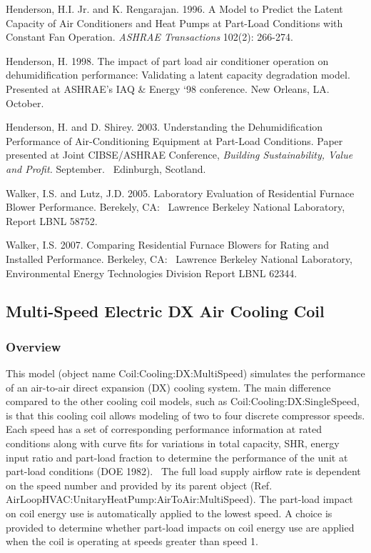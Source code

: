 Henderson, H.I. Jr. and K. Rengarajan. 1996. A Model to Predict the Latent Capacity of Air Conditioners and Heat Pumps at Part-Load Conditions with Constant Fan Operation. \emph{ASHRAE Transactions} 102(2): 266-274.

Henderson, H. 1998. The impact of part load air conditioner operation on dehumidification performance: Validating a latent capacity degradation model. Presented at ASHRAE's IAQ \& Energy `98 conference. New Orleans, LA.~ October.

Henderson, H. and D. Shirey. 2003. Understanding the Dehumidification Performance of Air-Conditioning Equipment at Part-Load Conditions. Paper presented at Joint CIBSE/ASHRAE Conference, \emph{Building Sustainability, Value and Profit.} September.~ Edinburgh, Scotland.

Walker, I.S. and Lutz, J.D. 2005. Laboratory Evaluation of Residential Furnace Blower Performance. Berekely, CA:~ Lawrence Berkeley National Laboratory, Report LBNL 58752.

Walker, I.S. 2007. Comparing Residential Furnace Blowers for Rating and Installed Performance. Berkeley, CA:~ Lawrence Berkeley National Laboratory, Environmental Energy Technologies Division Report LBNL 62344.

\subsection{Multi-Speed Electric DX Air Cooling Coil}\label{multi-speed-electric-dx-air-cooling-coil}

\subsubsection{Overview}\label{overview-2-004}

This model (object name Coil:Cooling:DX:MultiSpeed) simulates the performance of an air-to-air direct expansion (DX) cooling system. The main difference compared to the other cooling coil models, such as Coil:Cooling:DX:SingleSpeed, is that this cooling coil allows modeling of two to four discrete compressor speeds. Each speed has a set of corresponding performance information at rated conditions along with curve fits for variations in total capacity, SHR, energy input ratio and part-load fraction to determine the performance of the unit at part-load conditions (DOE 1982).~ The full load supply airflow rate is dependent on the speed number and provided by its parent object (Ref. AirLoopHVAC:UnitaryHeatPump:AirToAir:MultiSpeed). The part-load impact on coil energy use is automatically applied to the lowest speed. A choice is provided to determine whether part-load impacts on coil energy use are applied when the coil is operating at speeds greater than speed 1.

